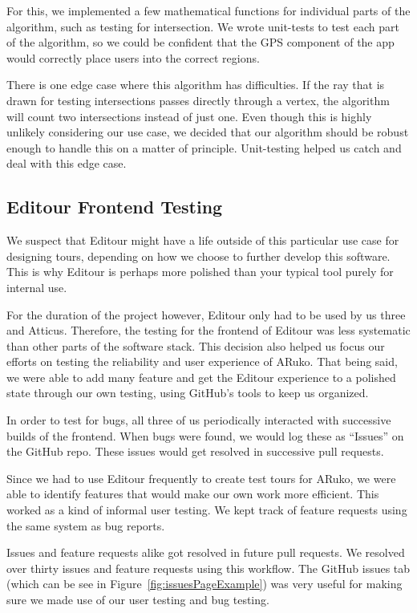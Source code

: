 \documentclass[a4paper, 10pt, american, titlepage]{article}
\begin{document}
For this, we implemented a few mathematical functions for individual parts of
the algorithm, such as testing for intersection. We wrote unit-tests to test
each part of the algorithm, so we could be confident that the GPS component of
the app would correctly place users into the correct regions.

There is one edge case where this algorithm has difficulties. If the ray that
is drawn for testing intersections passes directly through a vertex, the
algorithm will count two intersections instead of just one. Even though this is
highly unlikely considering our use case, we decided that our algorithm should
be robust enough to handle this on a matter of principle. Unit-testing helped us
catch and deal with this edge case.

\subsection{Editour Frontend Testing}
\label{sec:editourFrontendTesting}

We suspect that Editour might have a life outside of this particular use case
for designing tours, depending on how we choose to further develop this
software. This is why Editour is perhaps more polished than your typical tool
purely for internal use.

For the duration of the project however, Editour only had to be used by us
three and Atticus. Therefore, the testing for the frontend of Editour was less
systematic than other parts of the software stack. This decision also helped us
focus our efforts on testing the reliability and user experience of ARuko. That
being said, we were able to add many feature and get the Editour experience to
a polished state through our own testing, using GitHub's tools to keep us
organized.

In order to test for bugs, all three of us periodically interacted with
successive builds of the frontend. When bugs were found, we would log these as
``Issues'' on the GitHub repo. These issues would get resolved in successive
pull requests.

Since we had to use Editour frequently to create test tours for ARuko, we were
able to identify features that would make our own work more efficient. This
worked as a kind of informal user testing. We kept track of feature requests
using the same system as bug reports.

Issues and feature requests alike got resolved in future pull requests. We
resolved over thirty issues and feature requests using this workflow. The
GitHub issues tab (which can be see in Figure~\ref{fig:issuesPageExample}) was
very useful for making sure we made use of our user testing and bug testing.
\end{document}
